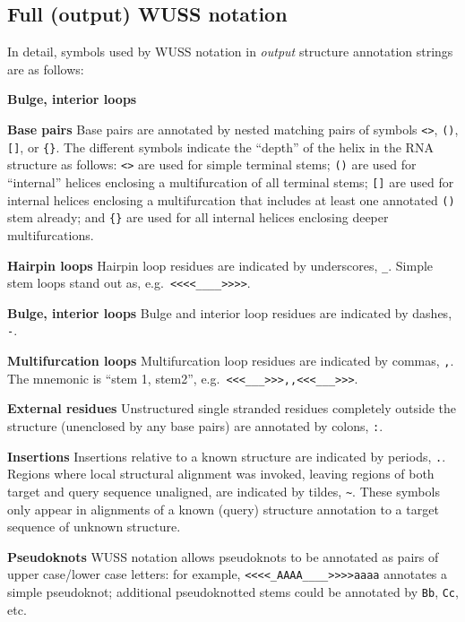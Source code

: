 \subsection{Full (output) WUSS notation}

In detail, symbols used by WUSS notation in \emph{output} structure
annotation strings are as follows:

\begin{sreitems}{\textbf{Bulge, interior loops}}
\item[\textbf{Base pairs}]
  Base pairs are annotated by nested matching pairs of symbols
  \verb+<>+, \verb+()+, \verb+[]+, or \verb+{}+.
  The different symbols indicate the ``depth'' of the
  helix in the RNA structure as follows:
  \verb+<>+ are used for simple terminal stems;
  \verb+()+ are used for ``internal'' helices enclosing a multifurcation of
  all terminal stems; \verb+[]+ are used for internal helices
  enclosing a multifurcation that includes at least one annotated
  \verb+()+ stem already; and \verb+{}+ are used for all internal
  helices enclosing deeper multifurcations.

\item[\textbf{Hairpin loops}]
  Hairpin loop residues are indicated by underscores, \verb+_+.
  Simple stem loops stand out as, e.g.\ \verb+<<<<____>>>>+.

\item[\textbf{Bulge, interior loops}]
  Bulge and interior loop residues are indicated by dashes, \verb+-+.

\item[\textbf{Multifurcation loops}]
  Multifurcation loop residues are indicated by commas, \verb+,+.
  The mnemonic is ``stem 1, stem2'', e.g.\ \verb+<<<___>>>,,<<<___>>>+.

\item[\textbf{External residues}]
  Unstructured single stranded residues completely outside the
  structure (unenclosed by any base pairs) are annotated by
  colons, \verb+:+.

\item[\textbf{Insertions}]
  Insertions relative to a known structure are indicated by periods,
  \verb+.+. Regions where local structural alignment was invoked,
  leaving regions of both target and query sequence unaligned,
  are indicated by tildes, \verb+~+. These symbols only appear in
  alignments of a known (query) structure annotation to a target
  sequence of unknown structure.

\item[\textbf{Pseudoknots}]
  WUSS notation allows pseudoknots to be annotated as pairs of
  upper case/lower case letters: for example,
  \verb+<<<<_AAAA____>>>>aaaa+ annotates a simple pseudoknot;
  additional pseudoknotted stems could be annotated by \verb+Bb+,
  \verb+Cc+, etc. 


\end{sreitems}
